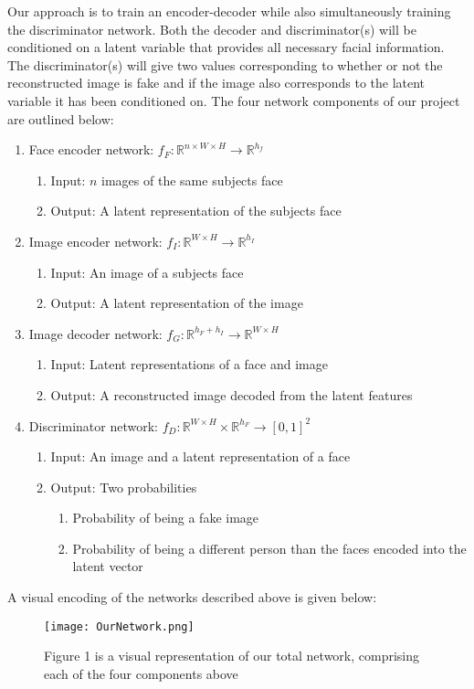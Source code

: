 \documentclass{article}
\begin{document}
Our approach is to train an encoder-decoder while also simultaneously training the discriminator network. Both the decoder and discriminator(s) will be conditioned on a latent variable that provides all necessary facial information. The discriminator(s) will give two values corresponding to whether or not the reconstructed image is fake and if the image also corresponds to the latent variable it has been conditioned on. The four network components of our project are outlined below: \\
\begin{enumerate}
\item Face encoder network: $f_F: \mathbb{R}^{n\times W \times H} \rightarrow \mathbb{R}^{h_f}$
\begin{enumerate}
\item Input: $n$ images of the same subjects face
\item Output: A latent representation of the subjects face
\end{enumerate}
\item Image encoder network: $f_I: \mathbb{R}^{W \times H} \rightarrow \mathbb{R}^{h_I}$
\begin{enumerate}
    \item Input: An image of a subjects face
    \item Output: A latent representation of the image
\end{enumerate}
\item Image decoder network: $f_G: \mathbb{R}^{h_F + h_I} \rightarrow \mathbb{R}^{W \times H}$
\begin{enumerate}
    \item Input: Latent representations of a face and image
    \item Output: A reconstructed image decoded from the latent features
\end{enumerate}
\item Discriminator network: $f_D: \mathbb{R}^{W \times H} \times \mathbb{R}^{h_F} \rightarrow [0,1]^2$
\begin{enumerate}
    \item Input: An image and a latent representation of a face
    \item Output: Two probabilities
    \begin{enumerate}
        \item Probability of being a fake image
        \item Probability of being a different person than the faces encoded into the latent vector
    \end{enumerate}
\end{enumerate}
\end{enumerate}
A visual encoding of the networks described above is given below:
\begin{figure}
    \centering
    \texttt{[image: OurNetwork.png]}
    \caption{Figure 1 is a visual representation of our total network, comprising each of the four components above}
    \label{fig:my_label}
\end{figure}
\end{document}
